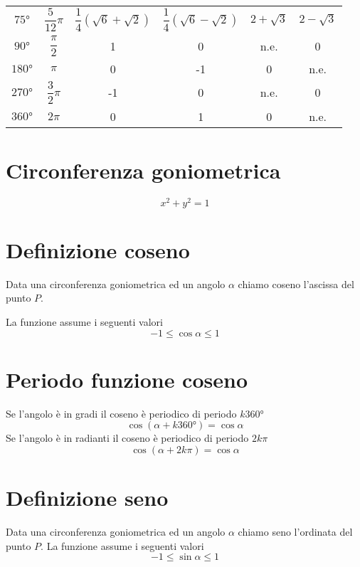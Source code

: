 \begin{center}
\begin{tabular}{cccccc}
		$\ang{75}$ &$\dfrac{5}{12}\pi$ &$\dfrac{1}{4}\left(\sqrt{6}+\sqrt{2}\right)$&$\dfrac{1}{4}\left(\sqrt{6}-\sqrt{2}\right)$&$2+\sqrt{3}$& $2-\sqrt{3}$ \\ [.25cm]
		$\ang{90}$&$\dfrac{\pi}{2}$&1&0&n.e.&0\\[.25cm]
		$\ang{180}$&$\pi$&0&-1& 0 &n.e.\\ [.25cm]
		$\ang{270}$&$\dfrac{3}{2}\pi$&-1&0&n.e.&0\\ [.25cm]
		$\ang{360}$&$2\pi$&0&1&0&n.e.\\ [.25cm]
		\bottomrule%
	\end{tabular}
\end{center}
\section{Circonferenza goniometrica}
\begin{equation}
x^2+y^2=1
\end{equation}
\section{Definizione coseno}
Data una circonferenza goniometrica ed un angolo $\alpha$ chiamo coseno l'ascissa del punto $P$.
\begin{center}
	
\end{center}
La funzione assume i seguenti valori
\begin{equation}
-1\leq \cos\alpha \leq 1
\end{equation}
\section{Periodo funzione coseno}
Se l'angolo è in gradi il coseno è periodico di periodo $k\ang{360}$
\begin{equation}
\cos(\alpha+k\ang{360;;})=\cos\alpha
\end{equation}
Se l'angolo è in radianti il coseno è periodico di periodo $2k\pi$
\begin{equation}
\cos(\alpha+2k\pi)=\cos\alpha
\end{equation}
\section{Definizione seno}
Data una circonferenza goniometrica ed un angolo $\alpha$ chiamo seno l'ordinata del punto $P$. La funzione assume i seguenti valori
\begin{equation}
-1\leq \sin\alpha \leq 1
\end{equation}
\begin{center}
	
\end{center}
